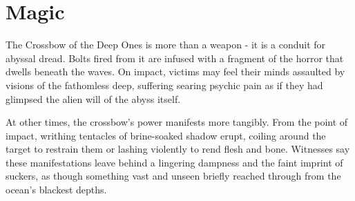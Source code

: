 \section*{Magic}
{\entryfont The Crossbow of the Deep Ones is more than a weapon - it is a conduit for abyssal dread. Bolts fired from it are infused with a fragment of the horror that dwells beneath the waves. On impact, victims may feel their minds assaulted by visions of the fathomless deep, suffering searing psychic pain as if they had glimpsed the alien will of the abyss itself.

At other times, the crossbow's power manifests more tangibly. From the point of impact, writhing tentacles of brine-soaked shadow erupt, coiling around the target to restrain them or lashing violently to rend flesh and bone. Witnesses say these manifestations leave behind a lingering dampness and the faint imprint of suckers, as though something vast and unseen briefly reached through from the ocean's blackest depths.}
